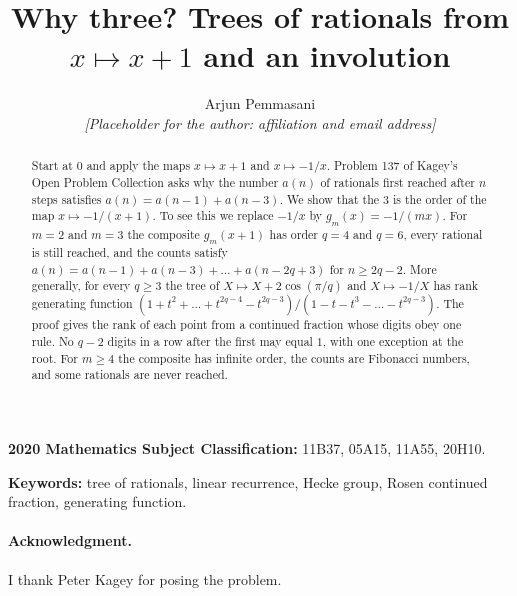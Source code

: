 \documentclass[11pt]{article}
\title{Why three? Trees of rationals from $x\mapsto x+1$ and an involution}
\author{Arjun Pemmasani\\
\textit{[Placeholder for the author: affiliation and email address]}}
\date{}
\theoremstyle{definition}
\theoremstyle{remark}
\begin{document}
\maketitle

\begin{abstract}
Start at $0$ and apply the maps $x\mapsto x+1$ and $x\mapsto-1/x$. Problem 137 of Kagey's Open Problem
Collection asks why the number $a(n)$ of rationals first reached after $n$ steps satisfies
$a(n)=a(n-1)+a(n-3)$. We show that the $3$ is the order of the map $x\mapsto-1/(x+1)$. To see this we
replace $-1/x$ by $g_m(x)=-1/(mx)$. For $m=2$ and $m=3$ the composite $g_m(x+1)$ has order $q=4$ and
$q=6$, every rational is still reached, and the counts satisfy
$a(n)=a(n-1)+a(n-3)+\dots+a(n-2q+3)$ for $n\ge 2q-2$. More generally, for every $q\ge3$ the tree of
$X\mapsto X+2\cos(\pi/q)$ and $X\mapsto-1/X$ has rank generating function
$(1+t^2+\dots+t^{2q-4}-t^{2q-3})/(1-t-t^3-\dots-t^{2q-3})$. The proof gives the rank of each point
from a continued fraction whose digits obey one rule. No $q-2$ digits in a row after the first may
equal $1$, with one exception at the root. For
$m\ge4$ the composite has infinite order, the counts are Fibonacci numbers, and some rationals are
never reached.
\end{abstract}

\noindent\textbf{2020 Mathematics Subject Classification:} 11B37, 05A15, 11A55, 20H10.

\noindent\textbf{Keywords:} tree of rationals, linear recurrence, Hecke group, Rosen continued
fraction, generating function.








\paragraph{Acknowledgment.} I thank Peter Kagey for posing the problem.
\end{document}

